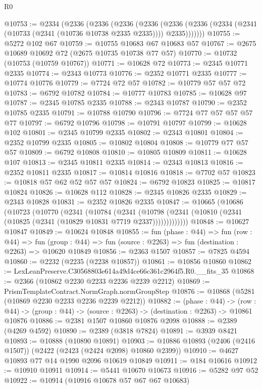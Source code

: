 \begin{lexlean}{R0}
\begin{coremodule}
@10753 := @2334
    (@2336
      (@2336
        (@2336
          (@2336
            (@2336 (@2336 (@2334 (@2341 (@10733 (@2341 (@10736 @10738 @2335 @2335)))) @2335)))))))
@10755 := @5272 @102 @67
@10759 := @10755 @10683 @67 @10683 @57
@10767 := @2675 @10689 @10692 @72 (@2675 @10735 @10738 @77 @57)
@10770 := @10732 (@10753 (@10759 @10767))
@10771 := @10628 @72
@10773 := @2345 @10771 @2335
@10774 := @2343 @10773
@10776 := @2352 @10771 @2335
@10777 := @10774 @10776
@10779 := @7724 @72 @57
@10782 := @10779 @57 @57 @72
@10783 := @6792 @10782
@10784 := @10777 @10783
@10785 := @10628 @97
@10787 := @2345 @10785 @2335
@10788 := @2343 @10787
@10790 := @2352 @10785 @2335
@10791 := @10788 @10790
@10796 := @7724 @77 @57 @57 @57 @77
@10797 := @6792 @10796
@10798 := @10791 @10797
@10799 := @10628 @102
@10801 := @2345 @10799 @2335
@10802 := @2343 @10801
@10804 := @2352 @10799 @2335
@10805 := @10802 @10804
@10808 := @10779 @77 @57 @57
@10809 := @6792 @10808
@10810 := @10805 @10809
@10811 := @10628 @107
@10813 := @2345 @10811 @2335
@10814 := @2343 @10813
@10816 := @2352 @10811 @2335
@10817 := @10814 @10816
@10818 := @7702 @57
@10823 := @10818 @57 @62 @52 @57 @57
@10824 := @6792 @10823
@10825 := @10817 @10824
@10826 := @10628 @112
@10828 := @2345 @10826 @2335
@10829 := @2343 @10828
@10831 := @2352 @10826 @2335
@10847 := @10665
    (@10686
      (@10723
        (@10770
          (@2341
            (@10784
              (@2341
                (@10798 (@2341 (@10810 (@2341 (@10825 (@2341 (@10829 @10831 @7719 @2337)))))))))))))
@10848 := @10627 @10847
@10849 := @10624 @10848
@10855 := fun (phase : @44) =>
  fun (row : @44) =>
  fun (group : @44) => fun (source : @2263) => fun (destination : @2263) => @10620 @10849
@10856 := @2363 @1507
@10857 := @7825 @4594
@10860 := @2232 (@2235 (@2238 @10857))
@10861 := @10856 @10860
@10862 := LexLeanPreserve.C30568803e614a49d4ce66c361c2964f5.R0.__fits_35
@10868 := @2366 (@10862 @2230 @2233 @2236 @2239 @2212)
@10869 := PrismTemplateContract.NormGraph.normGroupStep
@10876 := @10868 (@5281 (@10869 @2230 @2233 @2236 @2239 @2212))
@10882 := (phase : @44) ->
  (row : @44) -> (group : @44) -> (source : @2263) -> (destination : @2263) -> @10861 @10876
@10886 := @2381 @1507 @10860 @10876 @2098
@10888 := @2389 (@4269 @4592)
@10890 := @2389 (@3818 @7824)
@10891 := @3939 @8421
@10893 := @10888 (@10890 @10891)
@10903 := @10886 @10893 (@2406 (@2416 @1507)) (@2422 (@2423 (@2424 @2098) @10860 @2399))
@10910 := @4627 @10893 @77 @14 @1990 @2096 @10619 @10849
@10911 := @184 @10616
@10912 := @10910 @10911
@10914 := @5441 @10670 @10673
@10916 := @5282 @97 @52
@10922 := @10914 (@10916 @10678 @57 @67 @67 @10683)

\end{coremodule}
\end{lexlean}
